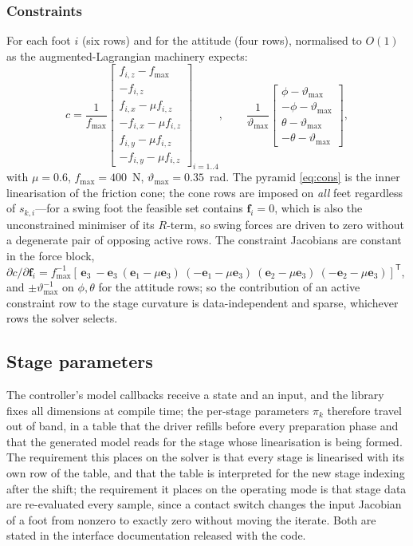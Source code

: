 \documentclass[11pt]{article}
\newcommand{\T}{^{\mathsf T}}
\newcommand{\bfv}{\bm{f}}\newcommand{\br}{\bm{r}}\newcommand{\bd}{\bm{d}}\newcommand{\bs}{\bm{s}}
\begin{document}
\subsubsection{Constraints}
For each foot $i$ (six rows) and for the attitude (four rows), normalised to $O(1)$ as the augmented-Lagrangian machinery expects:
\begin{equation}
c=\frac{1}{f_{\max}}\begin{bmatrix} f_{i,z}-f_{\max}\\ -f_{i,z}\\ f_{i,x}-\mu f_{i,z}\\ -f_{i,x}-\mu f_{i,z}\\ f_{i,y}-\mu f_{i,z}\\ -f_{i,y}-\mu f_{i,z}\end{bmatrix}_{i=1..4},\qquad
\frac{1}{\vartheta_{\max}}\begin{bmatrix}\phi-\vartheta_{\max}\\ -\phi-\vartheta_{\max}\\ \theta-\vartheta_{\max}\\ -\theta-\vartheta_{\max}\end{bmatrix},
\label{eq:cons}
\end{equation}
with $\mu=0.6$, $f_{\max}=400$~N, $\vartheta_{\max}=0.35$~rad. The pyramid \eqref{eq:cons} is the inner linearisation of the friction cone; the cone rows are imposed on \emph{all} feet regardless of $s_{k,i}$---for a swing foot the feasible set contains $\bfv_i=0$, which is also the unconstrained minimiser of its $R$-term, so swing forces are driven to zero without a degenerate pair of opposing active rows. The constraint Jacobians are constant in the force block, $\partial c/\partial\bfv_i=f_{\max}^{-1}[\,\bm e_3\ -\bm e_3\ (\bm e_1-\mu\bm e_3)\ (-\bm e_1-\mu\bm e_3)\ (\bm e_2-\mu\bm e_3)\ (-\bm e_2-\mu\bm e_3)]\T$, and $\pm\vartheta_{\max}^{-1}$ on $\phi,\theta$ for the attitude rows; so the contribution of an active constraint row to the stage curvature is data-independent and sparse, whichever rows the solver selects.

\subsection{Stage parameters}
The controller's model callbacks receive a state and an input, and the library fixes all dimensions at compile time; the per-stage parameters $\pi_k$ therefore travel out of band, in a table that the driver refills before every preparation phase and that the generated model reads for the stage whose linearisation is being formed. The requirement this places on the solver is that every stage is linearised with its own row of the table, and that the table is interpreted for the new stage indexing after the shift; the requirement it places on the operating mode is that stage data are re-evaluated every sample, since a contact switch changes the input Jacobian of a foot from nonzero to exactly zero without moving the iterate. Both are stated in the interface documentation released with the code.
\end{document}
